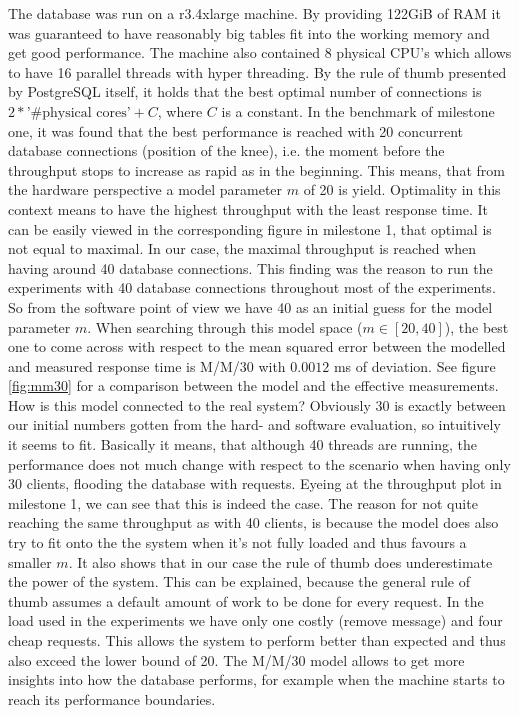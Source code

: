 \documentclass[11pt]{article}
\begin{document}
The database was run on a r3.4xlarge machine. By providing 122GiB of RAM it was guaranteed to have reasonably big tables fit into the working memory and get good performance. The machine also contained 8 physical CPU's which allows to have 16 parallel threads with hyper threading. By the rule of thumb presented by PostgreSQL itself, it holds that the best optimal number of connections is $2*\text{'\#physical cores'}+C$, where $C$ is a constant. In the benchmark of milestone one, it was found that the best performance is reached with 20 concurrent database connections (position of the knee), i.e. the moment before the throughput stops to increase as rapid as in the beginning. This means, that from the hardware perspective a model parameter $m$ of 20 is yield. Optimality in this context means to have the highest throughput with the least response time. It can be easily viewed in the corresponding figure in milestone 1, that optimal is not equal to maximal. In our case, the maximal throughput is reached when having around 40 database connections. This finding was the reason to run the experiments with 40 database connections throughout most of the experiments. So from the software point of view we have 40 as an initial guess for the model parameter $m$. When searching through this model space ($m\in[20, 40]$), the best one to come across with respect to the mean squared error between the modelled and measured response time is M/M/30 with $0.0012$ ms of deviation. See figure \ref{fig:mm30} for a comparison between the model and the effective measurements. How is this model connected to the real system? Obviously 30 is exactly between our initial numbers gotten from the hard- and software evaluation, so intuitively it seems to fit. Basically it means, that although 40 threads are running, the performance does not much change with respect to the scenario when having only 30 clients, flooding the database with requests. Eyeing at the throughput plot in milestone 1, we can see that this is indeed the case. The reason for not quite reaching the same throughput as with 40 clients, is because the model does also try to fit onto the the system when it's not fully loaded and thus favours a smaller $m$. It also shows that in our case the rule of thumb does underestimate the power of the system. This can be explained, because the general rule of thumb assumes a default amount of work to be done for every request. In the load used in the experiments we have only one costly (remove message) and four cheap requests. This allows the system to perform better than expected and thus also exceed the lower bound of 20. The M/M/30 model allows to get more insights into how the database performs, for example when the machine starts to reach its performance boundaries.
\end{document}
